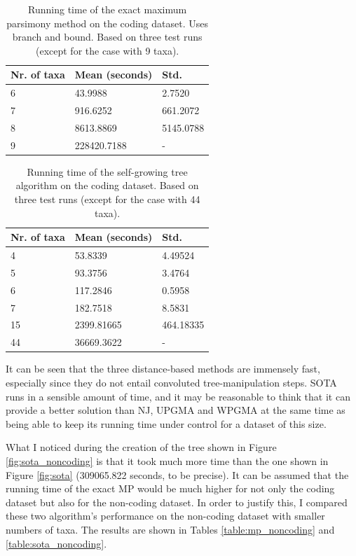 \documentclass[11pt,twocolumn]{article}
\begin{document}
\begin{table}[H]
  \caption{Running time of the exact maximum parsimony method on the coding dataset. Uses branch and bound. Based on three test runs (except for the case with 9 taxa).}
  \centering
  \begin{tabular}{lll}
    \toprule
    Nr. of taxa & Mean (seconds) & Std. \\
    \midrule
    6 & 43.9988 & 2.7520 \\
    7 & 916.6252 & 661.2072 \\
    8 & 8613.8869 & 5145.0788 \\
    9 & 228420.7188 & - \\
    \bottomrule
  \end{tabular}
\label{table:mp}
\end{table}

\begin{table}[H]
  \caption{Running time of the self-growing tree algorithm on the coding dataset. Based on three test runs (except for the case with 44 taxa).}
  \centering
  \begin{tabular}{lll}
    \toprule
    Nr. of taxa & Mean (seconds) & Std. \\
    \midrule
    4 & 53.8339 & 4.49524 \\
    5 & 93.3756 & 3.4764 \\
    6 & 117.2846 & 0.5958 \\
    7 & 182.7518 & 8.5831 \\
    15 & 2399.81665 & 464.18335 \\
    44 & 36669.3622 & - \\
    \bottomrule
  \end{tabular}
\label{table:sota}
\end{table}

It can be seen that the three distance-based methods are immensely fast, especially since they do not entail convoluted tree-manipulation steps. SOTA runs in a sensible amount of time, and it may be reasonable to think that it can provide a better solution than NJ, UPGMA and WPGMA at the same time as being able to keep its running time under control for a dataset of this size.

What I noticed during the creation of the tree shown in Figure \ref{fig:sota_noncoding} is that it took much more time than the one shown in Figure \ref{fig:sota} (309065.822 seconds, to be precise). It can be assumed that the running time of the exact MP would be much higher for not only the coding dataset but also for the non-coding dataset. In order to justify this, I compared these two algorithm's performance on the non-coding dataset with smaller numbers of taxa. The results are shown in Tables \ref{table:mp_noncoding} and \ref{table:sota_noncoding}.
\end{document}

